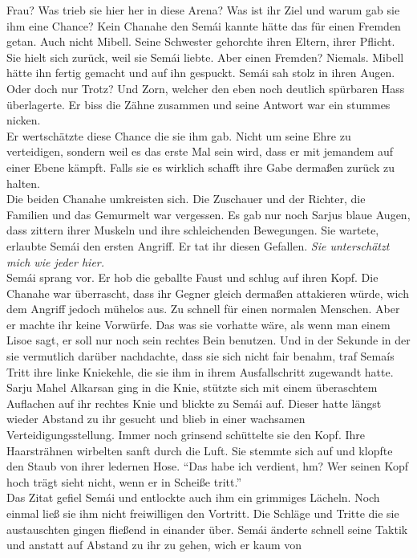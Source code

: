 Frau? Was trieb sie hier her in diese Arena? Was ist ihr Ziel und warum gab sie ihm eine Chance? 
Kein Chanahe den Semái kannte hätte das für einen Fremden getan. Auch nicht Mibell. Seine Schwester 
gehorchte ihren Eltern, ihrer Pflicht. Sie hielt sich zurück, weil sie Semái liebte. Aber einen 
Fremden? Niemals. Mibell hätte ihn fertig gemacht und auf ihn gespuckt. Semái sah stolz in ihren 
Augen. Oder doch nur Trotz? Und Zorn, welcher den eben noch deutlich spürbaren Hass überlagerte. Er 
biss die Zähne zusammen und seine Antwort war ein stummes nicken. \\
Er wertschätzte diese Chance die sie ihm gab. Nicht um seine Ehre zu verteidigen, sondern weil es 
das erste Mal sein wird, dass er mit jemandem auf einer Ebene kämpft. Falls sie es wirklich schafft 
ihre Gabe dermaßen zurück zu halten.\\
Die beiden Chanahe umkreisten sich. Die Zuschauer und der Richter, die Familien und das Gemurmelt 
war vergessen. Es gab nur noch Sarjus blaue Augen, dass zittern ihrer Muskeln und ihre 
schleichenden Bewegungen. Sie wartete, erlaubte Semái den ersten Angriff. Er tat ihr diesen 
Gefallen. \textit{Sie unterschätzt mich wie jeder hier.}\\
Semái sprang vor. Er hob die geballte Faust und schlug auf ihren Kopf. Die Chanahe war überrascht, 
dass ihr Gegner gleich dermaßen attakieren würde, wich dem Angriff jedoch mühelos aus. Zu schnell 
für einen normalen Menschen. Aber er machte ihr keine Vorwürfe. Das was sie vorhatte wäre, als wenn 
man einem Lisoe sagt, er soll nur noch sein rechtes Bein benutzen. Und in der Sekunde in der sie 
vermutlich darüber nachdachte, dass sie sich nicht fair benahm, traf Semaís Tritt ihre linke 
Kniekehle, die sie ihm in ihrem Ausfallschritt zugewandt hatte. Sarju Mahel Alkarsan ging in die 
Knie, stützte sich mit einem überaschtem Auflachen auf ihr rechtes Knie und blickte zu Semái auf. 
Dieser hatte längst wieder Abstand zu ihr gesucht und blieb in einer wachsamen 
Verteidigungsstellung. Immer noch grinsend schüttelte sie den Kopf. Ihre Haarsträhnen wirbelten 
sanft durch die Luft. Sie stemmte sich auf und klopfte den Staub von ihrer ledernen Hose. ``Das 
habe ich verdient, hm? Wer seinen Kopf hoch trägt sieht nicht, wenn er in Scheiße tritt.''\\
Das Zitat gefiel Semái und entlockte auch ihm ein grimmiges Lächeln. Noch einmal ließ sie ihm nicht 
freiwilligen den Vortritt. Die Schläge und Tritte die sie austauschten gingen fließend in einander 
über. Semái änderte schnell seine Taktik und anstatt auf Abstand zu ihr zu gehen, wich er kaum von 
